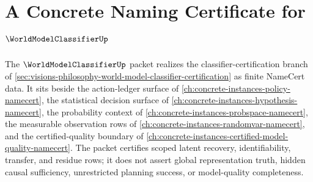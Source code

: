 \chapter{A Concrete Naming Certificate for $\WorldModelClassifierUp$}
\label{ch:concrete-instances-world-model-classifier-namecert}

The $\WorldModelClassifierUp$ packet realizes the classifier-certification branch of \autoref{sec:visions-philosophy-world-model-classifier-certification} as finite NameCert data. It sits beside the action-ledger surface of \autoref{ch:concrete-instances-policy-namecert}, the statistical decision surface of \autoref{ch:concrete-instances-hypothesis-namecert}, the probability context of \autoref{ch:concrete-instances-probspace-namecert}, the measurable observation rows of \autoref{ch:concrete-instances-randomvar-namecert}, and the certified-quality boundary of \autoref{ch:concrete-instances-certified-model-quality-namecert}. The packet certifies scoped latent recovery, identifiability, transfer, and residue rows; it does not assert global representation truth, hidden causal sufficiency, unrestricted planning success, or model-quality completeness.

